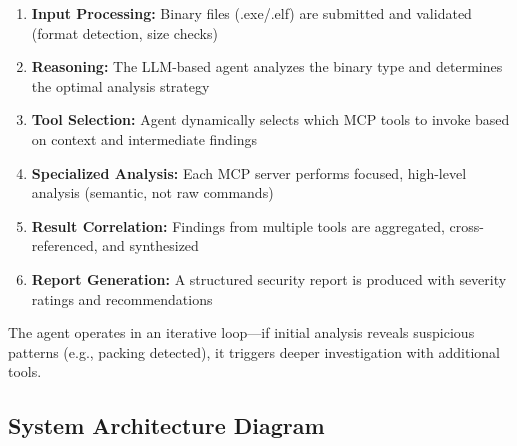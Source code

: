 \documentclass[11pt,a4paper]{article}
\begin{document}
\begin{enumerate}
  \item \textbf{Input Processing:} Binary files (.exe/.elf) are submitted and validated (format detection, size checks)
  \item \textbf{Reasoning:} The LLM-based agent analyzes the binary type and determines the optimal analysis strategy
  \item \textbf{Tool Selection:} Agent dynamically selects which MCP tools to invoke based on context and intermediate findings
  \item \textbf{Specialized Analysis:} Each MCP server performs focused, high-level analysis (semantic, not raw commands)
  \item \textbf{Result Correlation:} Findings from multiple tools are aggregated, cross-referenced, and synthesized
  \item \textbf{Report Generation:} A structured security report is produced with severity ratings and recommendations
\end{enumerate}

\noindent The agent operates in an iterative loop—if initial analysis reveals suspicious patterns (e.g., packing detected), it triggers deeper investigation with additional tools.

\subsection{System Architecture Diagram}
\end{document}
